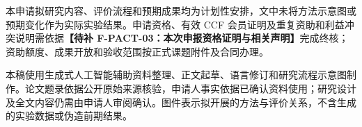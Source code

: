 \justifying
\NSFCBodyText

本申请拟研究内容、评价流程和预期成果均为计划性安排，文中未将方法示意图或预期变化作为实际实验结果。申请资格、有效 CCF 会员证明及重复资助和利益冲突说明需依据\textbf{【待补 F-PACT-03：本次申报资格证明与相关声明】}完成终核；资助额度、成果开放和验收范围按正式课题附件及合同办理。

本稿使用生成式人工智能辅助资料整理、正文起草、语言修订和研究流程示意图制作。论文题录依据公开原始来源核验，申请人事实依据已确认资料使用；研究设计及全文内容仍需由申请人审阅确认。图件表示拟开展的方法与评价关系，不含生成的实验数据或伪造前期结果。
